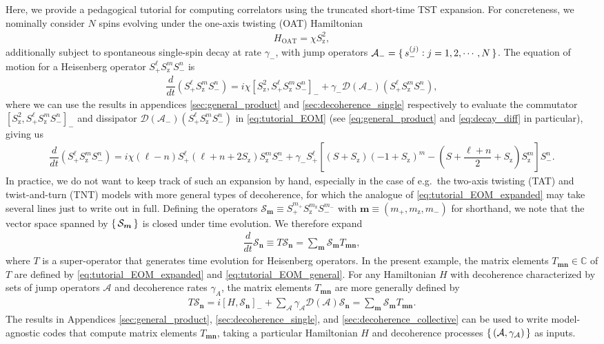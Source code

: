 \documentclass[pra,twocolumn,longbibliography]{revtex4-2}
\renewcommand{\t}{\text} %
\newcommand{\f}[2]{\dfrac{#1}{#2}} %
\newcommand{\p}[1]{\left( #1 \right)} %
\renewcommand{\sp}[1]{\left[ #1 \right]} %
\renewcommand{\v}{\bm} %
\newcommand{\A}{\mathcal{A}}
\newcommand{\D}{\mathcal{D}}
\renewcommand{\S}{\mathcal{S}}
\newcommand{\C}{\mathbb{C}}
\newcommand{\z}{\text{z}}
\newcommand{\1}{\mathds{1}}
\begin{document}
Here, we provide a pedagogical tutorial for computing correlators
using the truncated short-time TST expansion.  For concreteness, we
nominally consider $N$ spins evolving under the one-axis twisting
(OAT) Hamiltonian
\begin{align}
  H_{\t{OAT}} = \chi S_\z^2,
\end{align}
additionally subject to spontaneous single-spin decay at rate
$\gamma_-$, with jump operators $\A_-=\set{s_-^{(j)}:j=1,2,\cdots,N}$.
The equation of motion for a Heisenberg operator
$S_+^\ell S_\z^m S_-^n$ is
\begin{align}
  \f{d}{dt} \p{S_+^\ell S_\z^m S_-^n}
  = i\chi\sp{S_\z^2, S_+^\ell S_\z^m S_-^n}_-
  + \gamma_- \D\p{\A_-} \p{S_+^\ell S_\z^m S_-^n},
  \label{eq:tutorial_EOM}
\end{align}
where we can use the results in appendices \ref{sec:general_product}
and \ref{sec:decoherence_single} respectively to evaluate the
commutator $\sp{S_\z^2, S_+^\ell S_\z^m S_-^n}_-$ and dissipator
$\D\p{\A_-} \p{S_+^\ell S_\z^m S_-^n}$ in \eqref{eq:tutorial_EOM} (see
\eqref{eq:general_product} and \eqref{eq:decay_diff} in particular),
giving us
\begin{align}
  \f{d}{dt} \p{S_+^\ell S_\z^m S_-^n} =
  i\chi \p{\ell-n} S_+^\ell \p{\ell+n+2S_\z} S_\z^m S_-^n
  + \gamma_- S_+^\ell \sp{\p{S+S_\z}\p{-1+S_\z}^m
    - \p{S+\f{\ell+n}{2}+S_\z} S_\z^m} S_-^n.
  \label{eq:tutorial_EOM_expanded}
\end{align}
In practice, we do not want to keep track of such an expansion by
hand, especially in the case of e.g.~the two-axis twisting (TAT) and
twist-and-turn (TNT) models with more general types of decoherence,
for which the analogue of \eqref{eq:tutorial_EOM_expanded} may take
several lines just to write out in full.  Defining the operators
$\S_{\v m}\equiv S_+^{m_+} S_\z^{m_\z} S_-^{m_-}$ with
$\v m\equiv\p{m_+,m_\z,m_-}$ for shorthand, we note that the vector
space spanned by $\set{\S_{\v m}}$ is closed under time evolution.  We
therefore expand
\begin{align}
  \f{d}{dt} \S_{\v n} \equiv T \S_{\v n}
  = \sum_{\v m} \S_{\v m} T_{\v m\v n},
  \label{eq:tutorial_EOM_general}
\end{align}
where $T$ is a super-operator that generates time evolution for
Heisenberg operators.  In the present example, the matrix elements
$T_{\v m\v n}\in\C$ of $T$ are defined by
\eqref{eq:tutorial_EOM_expanded} and \eqref{eq:tutorial_EOM_general}.
For any Hamiltonian $H$ with decoherence characterized by sets of jump
operators $\A$ and decoherence rates $\gamma_A$, the matrix elements
$T_{\v m\v n}$ are more generally defined by
\begin{align}
  T \S_{\v n}
  = i\sp{H,\S_{\v n}}_- + \sum_\A \gamma_\A \D\p{\A} \S_{\v n}
  = \sum_{\v m} \S_{\v m} T_{\v m\v n}.
\end{align}
The results in Appendices \ref{sec:general_product},
\ref{sec:decoherence_single}, and \ref{sec:decoherence_collective} can
be used to write model-agnostic codes that compute matrix elements
$T_{\v m\v n}$, taking a particular Hamiltonian $H$ and decoherence
processes $\set{\p{\A,\gamma_\A}}$ as inputs.
\end{document}
